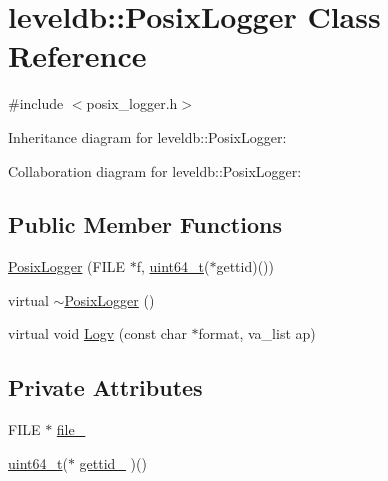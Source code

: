 \hypertarget{classleveldb_1_1_posix_logger}{\section{leveldb\-:\-:Posix\-Logger Class Reference}
\label{classleveldb_1_1_posix_logger}
}


{\ttfamily \#include $<$posix\-\_\-logger.\-h$>$}



Inheritance diagram for leveldb\-:\-:Posix\-Logger\-:


Collaboration diagram for leveldb\-:\-:Posix\-Logger\-:
\subsection*{Public Member Functions}
\begin{DoxyCompactItemize}
\item 
\hyperlink{classleveldb_1_1_posix_logger_a9c498babc43c3cfb5f863a252ce5d1d1}{Posix\-Logger} (F\-I\-L\-E $\ast$f, \hyperlink{stdint_8h_aaa5d1cd013383c889537491c3cfd9aad}{uint64\-\_\-t}($\ast$gettid)())
\item 
virtual \hyperlink{classleveldb_1_1_posix_logger_aa6fcbf43fa8feae2a9c25721b13b37ba}{$\sim$\-Posix\-Logger} ()
\item 
virtual void \hyperlink{classleveldb_1_1_posix_logger_ae7b521716a3e54c4be187806a81ccf6b}{Logv} (const char $\ast$format, va\-\_\-list ap)
\end{DoxyCompactItemize}
\subsection*{Private Attributes}
\begin{DoxyCompactItemize}
\item 
F\-I\-L\-E $\ast$ \hyperlink{classleveldb_1_1_posix_logger_a7aee075e8c3eff4d15e1eb76fc111dbe}{file\-\_\-}
\item 
\hyperlink{stdint_8h_aaa5d1cd013383c889537491c3cfd9aad}{uint64\-\_\-t}($\ast$ \hyperlink{classleveldb_1_1_posix_logger_a09c66b539e2462e5dac3fa009b1674ff}{gettid\-\_\-} )()
\end{DoxyCompactItemize}



